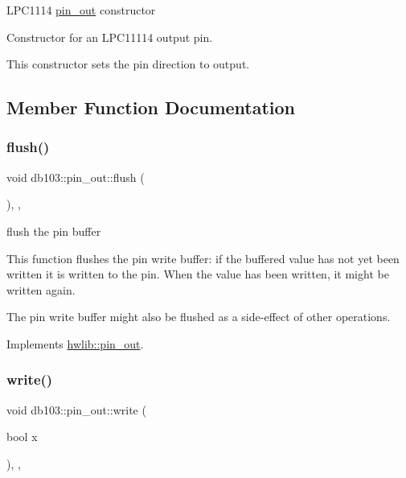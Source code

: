 L\+P\+C1114 \hyperlink{classdb103_1_1pin__out}{pin\+\_\+out} constructor

Constructor for an L\+P\+C11114 output pin.

This constructor sets the pin direction to output. 

\subsection{Member Function Documentation}
\mbox{\label{classdb103_1_1pin__out_ad94271fe261522bf18b35e084076c12d}} 
\subsubsection{\texorpdfstring{flush()}{flush()}}
{\footnotesize\ttfamily void db103\+::pin\+\_\+out\+::flush (\begin{DoxyParamCaption}{ }\end{DoxyParamCaption})\hspace{0.3cm}{\ttfamily [inline]}, {\ttfamily [override]}, {\ttfamily [virtual]}}





flush the pin buffer

This function flushes the pin write buffer\+: if the buffered value has not yet been written it is written to the pin. When the value has been written, it might be written again.

The pin write buffer might also be flushed as a side-\/effect of other operations. 

Implements \hyperlink{classhwlib_1_1pin__out_ac22910317477a52431a44e7e3c66fc57}{hwlib\+::pin\+\_\+out}.

\mbox{\label{classdb103_1_1pin__out_adb5167058deb8fbd3e4c1bbdb456a6e3}} 
\subsubsection{\texorpdfstring{write()}{write()}}
{\footnotesize\ttfamily void db103\+::pin\+\_\+out\+::write (\begin{DoxyParamCaption}\item[{bool}]{x }\end{DoxyParamCaption})\hspace{0.3cm}{\ttfamily [inline]}, {\ttfamily [override]}, {\ttfamily [virtual]}}





